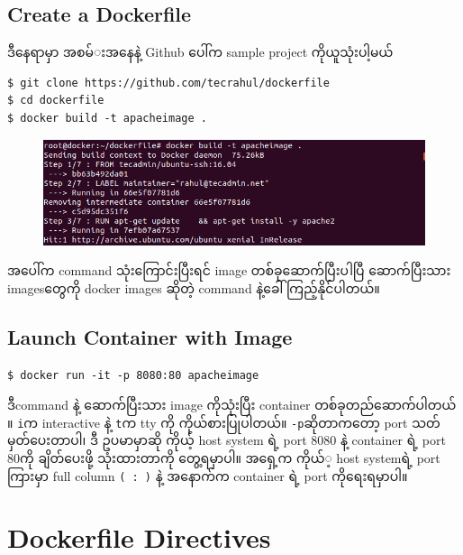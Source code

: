 \documentclass{article}
\begin{document}
\subsection{Create a Dockerfile}\label{create-a-dockerfile}

ဒီ​နေရာမှာ အစမ်​း​အ​နေနဲ့ Github ​ပေါ်က sample project ကိုယူသုံးပါ့မယ်​

\begin{verbatim}
$ git clone https://github.com/tecrahul/dockerfile 
$ cd dockerfile
$ docker build -t apacheimage .
\end{verbatim}

\begin{figure}[htbp]
\centering
\includegraphics[width=0.70\paperwidth]{.gitbook/assets/3c_apacheimage_build.png}
\end{figure}

အ​ပေါ်က command သုံး​ကြောင်းပြီးရင်​ image တစ်​ခု​ဆောက်​ပြီးပါပြီ
​ဆောက်​ပြီးသား images ​တွေကို docker images ဆိုတဲ့ command
နဲ့​ခေါ်ကြည့်နိုင်​ပါတယ်​။

\subsection{Launch Container with
Image}\label{launch-container-with-image}

\begin{verbatim}
$ docker run -it -p 8080:80 apacheimage
\end{verbatim}

ဒီcommand နဲ့ ​ဆောက်​ပြီးသား image ကိုသုံးပြီး container
တစ်​ခုတည်​​ဆောက်​ပါတယ်​။ \texttt{i}က interactive နဲ့ \texttt{t}က tty ကို
ကိုယ်​စားပြုပါတယ်​။ \texttt{-p}ဆိုတာက​တော့ port သတ်​မှတ်​​ပေးတာပါ၊ ဒီ
ဥပမာမှာဆို ကိုယ့် host system ရဲ့ port 8080 နဲ့ container ရဲ့ port 80ကို
ချိတ်​​ပေးဖို့ သုံးထားတာကို ​တွေ့ရမှာပါ။ အ​ရှေ့က ကိုယ်​့ host systemရဲ့
port ကြားမှာ full column \texttt{( : )} နဲ့ အ​နောက်​က container ရဲ့ port
ကို​ရေးရမှာပါ။

\section{Dockerfile Directives}\label{dockerfile-directives}
\end{document}
